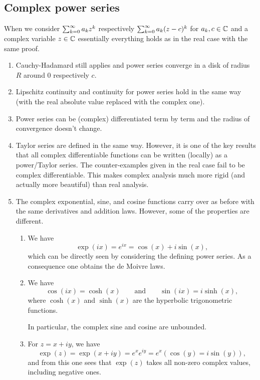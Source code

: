 \documentclass[10pt, a4paper]{article}
\begin{document}
\subsection{Complex power series}
When we consider $\sum_{k = 0}^{\infty} a_kz ^ k$ respectively $\sum_{k = 0}^{\infty} a_k(z - c) ^ k$ for $a_k, c \in \mathbb{C}$ and a complex variable $z \in \mathbb{C}$ essentially everything holds as in the real case with the same proof.
\begin{enumerate}[label = (\roman*)]
    \item Cauchy-Hadamard still applies and power series converge in a disk of radius $R$ around $0$ respectively $c$.

    \item Lipschitz continuity and continuity for power series hold in the same way
    (with the real absolute value replaced with the complex one).

    \item Power series can be
    (complex)
    differentiated term by term and the radius of convergence doesn't change.

    \item Taylor series are defined in the same way.
    However,
    it is one of the key results that all complex differentiable functions can be written
    (locally)
    as a power/Taylor series.
    The counter-examples given in the real case fail to be complex differentiable.
    This makes complex analysis much more rigid
    (and actually more beautiful)
    than real analysis.

    \item
    The complex exponential,
    sine,
    and cosine functions carry over as before with the same derivatives and addition laws.
    However,
    some of the properties are different.
    \begin{enumerate}[label = (\alph*)]
        \item We have
        \[
        \exp(ix) = e ^ {ix} = \cos(x) + i\sin(x),
        \]
        which can be directly seen by considering the defining power series.
        As a consequence one obtains the de Moivre laws.

        \item We have
        \[
        \cos(ix) = \cosh(x)\qquad\text{and}\qquad\sin(ix) = i\sinh(x),
        \]
        where $\cosh(x)$ and $\sinh(x)$ are the hyperbolic trigonometric functions.

        In particular,
        the complex sine and cosine are unbounded.

        \item For $z = x + iy$,
        we have
        \[
        \exp(z) = \exp(x + iy) = e ^ xe ^ {iy} = e ^ x(\cos(y) = i\sin(y)),
        \]
        and from this one sees that $\exp(z)$ takes all non-zero complex values,
        including negative ones.
    \end{enumerate}
\end{enumerate}
\newpage
\end{document}

